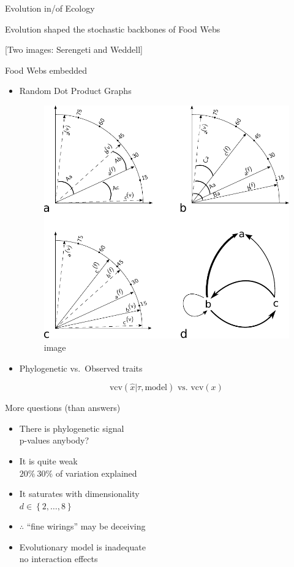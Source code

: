 \begin{frame}
{Evolution in/of Ecology}

Evolution shaped the stochastic backbones of Food Webs

{{[}Two images: Serengeti and Weddell{]}}

{Food Webs embedded}

\begin{itemize}[<+->]
\item
  Random Dot Product Graphs

  \begin{figure}[htbp]
  \centering
  \includegraphics{images/RDPGmodel.pdf}
  \caption{image}
  \end{figure}
\item
  Phylogenetic vs.~Observed traits

  \[\textrm{vcv}\left( \hat{x} | \tau, \mbox{model} \right) \mbox{ vs. } \textrm{vcv}\left(x\right)\]
\end{itemize}

{More questions (than answers)}

\begin{itemize}[<+->]
\item
  There is phylogenetic signal\\{p-values anybody?}
\item
  It is quite weak\\{$20\% ~ 30\%$ of variation explained}
\item
  It saturates with
  dimensionality\\{$d \in \left\{2, \dots , 8 \right\}$}
\item
  $\therefore$ ``fine wirings'' may be deceiving
\item
  Evolutionary model is inadequate\\{no interaction effects}
\end{itemize}


\end{frame}
